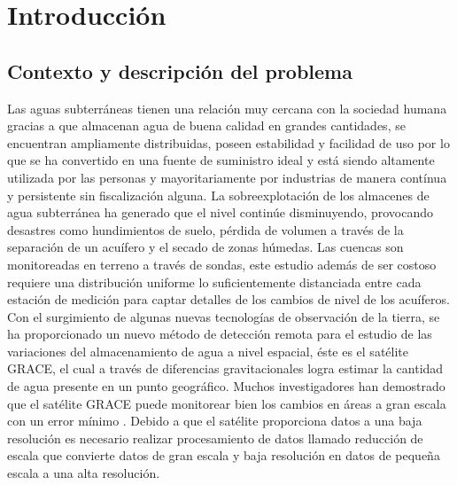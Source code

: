 \chapter{Introducción}

\section{Contexto y descripción del problema}
Las aguas subterráneas tienen una relación muy cercana con la sociedad humana gracias a que almacenan 
agua de buena calidad en grandes cantidades, se encuentran ampliamente distribuidas, poseen estabilidad 
y facilidad de uso por lo que se ha convertido en una fuente de suministro ideal y está siendo altamente 
utilizada por las personas \cite{11} y mayoritariamente por industrias de manera contínua y persistente sin 
fiscalización alguna. La sobreexplotación de los almacenes de agua subterránea ha generado que el nivel 
continúe disminuyendo, provocando desastres como hundimientos de suelo, pérdida de volumen a través de la
 separación de un acuífero y el secado de zonas húmedas.
Las cuencas son monitoreadas en terreno a través de sondas, este estudio además de ser costoso requiere 
una distribución uniforme lo suficientemente distanciada entre cada estación de medición para captar 
detalles de los cambios de nivel de los acuíferos. 
Con el surgimiento de algunas nuevas tecnologías de observación de la tierra, 
se ha proporcionado un nuevo método de detección remota para el estudio de las variaciones 
del almacenamiento de agua a nivel espacial, éste es el satélite GRACE, el cual a través de 
diferencias gravitacionales logra estimar la cantidad de agua presente en un punto geográfico. 
Muchos investigadores han demostrado que el satélite GRACE puede monitorear bien los cambios en áreas 
a gran escala con un error mínimo \cite{11}. Debido a que el satélite proporciona datos a una baja resolución es 
necesario realizar procesamiento de datos llamado reducción de escala que convierte datos de gran escala
y baja resolución en datos de pequeña escala a una alta resolución. 
%
%
%
%
